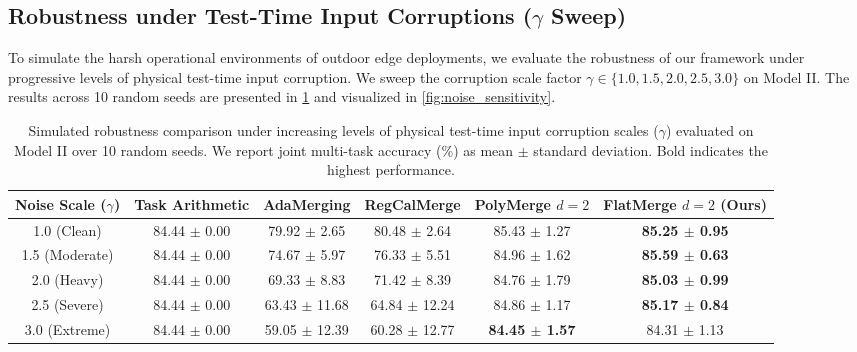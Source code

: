 \subsection{Robustness under Test-Time Input Corruptions ($\gamma$ Sweep)} \label{sec:experiments_robust}
To simulate the harsh operational environments of outdoor edge deployments, we evaluate the robustness of our framework under progressive levels of physical test-time input corruption. 
We sweep the corruption scale factor $\gamma \in \{1.0, 1.5, 2.0, 2.5, 3.0\}$ on Model II. 
The results across 10 random seeds are presented in \cref{tab:robustness_sweep} and visualized in \cref{fig:noise_sensitivity}.

\begin{table}[t]
\caption{Simulated robustness comparison under increasing levels of physical test-time input corruption scales ($\gamma$) evaluated on Model II over 10 random seeds. We report joint multi-task accuracy (\%) as mean $\pm$ standard deviation. Bold indicates the highest performance.}
\label{tab:robustness_sweep}
\vskip 0.15in
\begin{center}
\begin{small}
\begin{sc}
\begin{tabular}{cccccc}
\toprule
Noise Scale ($\gamma$) & Task Arithmetic & AdaMerging & RegCalMerge & PolyMerge $d=2$ & FlatMerge $d=2$ (Ours) \\
\midrule
1.0 (Clean) & 84.44 $\pm$ 0.00 & 79.92 $\pm$ 2.65 & 80.48 $\pm$ 2.64 & 85.43 $\pm$ 1.27 & \textbf{85.25 $\pm$ 0.95} \\
1.5 (Moderate) & 84.44 $\pm$ 0.00 & 74.67 $\pm$ 5.97 & 76.33 $\pm$ 5.51 & 84.96 $\pm$ 1.62 & \textbf{85.59 $\pm$ 0.63} \\
2.0 (Heavy) & 84.44 $\pm$ 0.00 & 69.33 $\pm$ 8.83 & 71.42 $\pm$ 8.39 & 84.76 $\pm$ 1.79 & \textbf{85.03 $\pm$ 0.99} \\
2.5 (Severe) & 84.44 $\pm$ 0.00 & 63.43 $\pm$ 11.68 & 64.84 $\pm$ 12.24 & 84.86 $\pm$ 1.17 & \textbf{85.17 $\pm$ 0.84} \\
3.0 (Extreme) & 84.44 $\pm$ 0.00 & 59.05 $\pm$ 12.39 & 60.28 $\pm$ 12.77 & \textbf{84.45 $\pm$ 1.57} & 84.31 $\pm$ 1.13 \\
\bottomrule
\end{tabular}
\end{sc}
\end{small}
\end{center}
\vskip -0.1in
\end{table}

